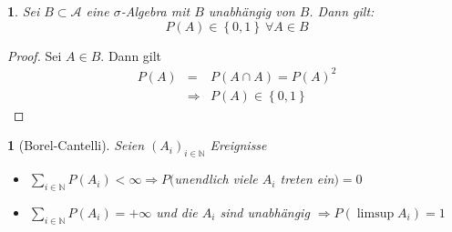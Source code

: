 \documentclass[10pt,a4paper]{report}
\numberwithin{equation}{section}
\numberwithin{figure}{section}
\theoremstyle{plain}
\theoremstyle{definition}
\theoremstyle{remark}
\theoremstyle{plain}
\newtheorem{lem}[thm]{\protect\lemmaname}
\providecommand{\lemmaname}{Lemma}
\newcommand{\1}{ \mathbb{1} } %
\begin{document}
\begin{lem}  %
  Sei $B\subset\mathcal{A}$ eine $\sigma$-Algebra mit $B$ unabhängig
  von $B$. Dann gilt:
  \[
  P\left(A\right)\in\left\{ 0,1\right\} \ \forall A\in B
  \]
\end{lem}
\begin{proof}
  Sei $A\in B$. Dann gilt
  \begin{eqnarray*}
    P\left(A\right) & = & P\left(A\cap A\right)=P\left(A\right)^{2}\\
    & \Rightarrow & P\left(A\right)\in\left\{ 0,1\right\} 
  \end{eqnarray*}
\end{proof}
\begin{lem}[Borel-Cantelli] 
  Seien $\left(A_{i}\right)_{i\in\mathbb{N}}$ Ereignisse
  \begin{itemize}
  \item [{(i)}] $\sum_{i\in\mathbb{N}}P\left(A_{i}\right)<\infty\Rightarrow$$P($unendlich
    viele $A_{i}$ treten ein$)=0$
  \item [{(ii)}] $\sum_{i\in\mathbb{N}}P\left(A_{i}\right)=+\infty$ und
    die $A_{i}$ sind unabhängig $\Rightarrow P\left(\limsup A_{i}\right)=1$
  \end{itemize}
\end{lem}
\end{document}

